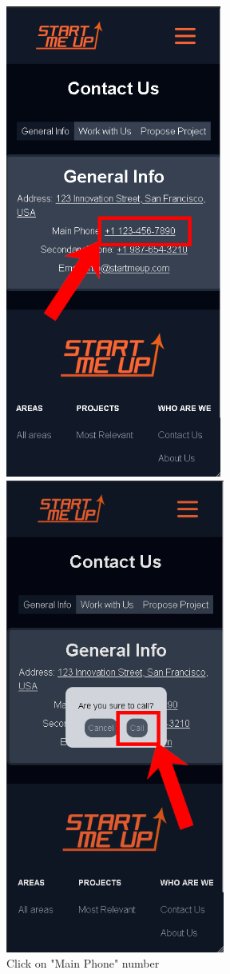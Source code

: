 \documentclass[11pt, letterpaper]{article}
\begin{document}
\begin{figure}[H]
  \centering
  \begin{minipage}[b]{0.4\textwidth}
    \includegraphics[width=7.1cm]{images/Scenarios/Scenario4/Screen11.png}
    \caption{Click on "Main Phone" number}
    \label{fig:scenario4_11}
  \end{minipage}
  \hfill
  \begin{minipage}[b]{0.4\textwidth}
    \includegraphics[width=7.2cm]{images/Scenarios/Scenario4/Screen12.png}

\end{minipage}
\end{figure}
\end{document}
